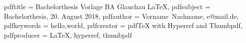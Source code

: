 \newcommand{\dcsubject}{Bachelorthesis} %
\newcommand{\dctitle}{Bachelorthesis Vorlage BA Glauchau LaTeX}
\newcommand{\dcdate}{20. August 2018}
\newcommand{\dckeywords}{hello,world}

\newcommand{\dcauthorlastname}{Nachname}
\newcommand{\dcauthorfirstname}{Vorname}
\newcommand{\dcauthoremail}{e@mail.de}
\newcommand{\dcstreet}{Musterstraße, 17}
\newcommand{\dcplace}{12345, Musterstadt}

\newcommand{\dcuni}{Staatliche Studienakademie Glauchau}
\newcommand{\dccourse}{Technische Informatik}
\newcommand{\dcfield}{Daten- und Kommunikationstechnik}
\newcommand{\dcgroup}{Seminargr.}
\newcommand{\dcmatnr}{Matrikelnr.}

\newcommand{\dccompany}{Mustermann GmbH GmbH}
\newcommand{\dccompanystr}{Musterstraße, 17}
\newcommand{\dccompanycity}{12345, Musterstadt}

\newcommand{\refereecompany}{Dipl.-Ing. Moritz Mustermann}
\newcommand{\refereeuni}{Prof. Dr. Max Mustermann}

\hypersetup
{
	pdftitle	= {\dctitle},
	pdfsubject	= {\dcsubject, \dcdate},
	pdfauthor	= {\dcauthorfirstname~\dcauthorlastname, \dcauthoremail},
	pdfkeywords	= {\dckeywords},
	pdfcreator	= {pdfTeX with Hyperref and Thumbpdf},
	pdfproducer	= {LaTeX, hyperref, thumbpdf}
}
